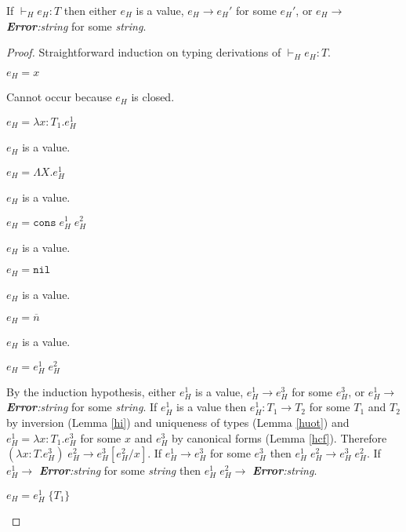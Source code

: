 \begin{hps}
\label{hps}
If $\vdash_{H}e_{H}:T$ then either $e_{H}$ is a value, $e_{H}\rightarrow e_{H}'$ for some $e_{H}'$, or $e_{H}\rightarrow$ \emph{\textbf{Error}:\;string} for some \emph{string}.



\begin{proof}
Straightforward induction on typing derivations of $\vdash_{H}e_{H}:T$.
\begin{hps-case-1}
$e_{H}=x$

Cannot occur because $e_{H}$ is closed.
\end{hps-case-1}
\begin{hps-case-2}
$e_{H}=\lambda x:T_{1}.e_{H}^{1}$

$e_{H}$ is a value.
\end{hps-case-2}
\begin{hps-case-3}
$e_{H}=\Lambda X.e_{H}^{1}$

$e_{H}$ is a value.
\end{hps-case-3}
\begin{hps-case-4}
$e_{H}=\mathtt{cons}\;e_{H}^{1}\;e_{H}^{2}$

$e_{H}$ is a value.
\end{hps-case-4}
\begin{hps-case-5}
$e_{H}=\mathtt{nil}$

$e_{H}$ is a value.
\end{hps-case-5}
\begin{hps-case-6}
$e_{H}=\overline{n}$

$e_{H}$ is a value.
\end{hps-case-6}
\begin{hps-case-7}
$e_{H}=e_{H}^{1}\;e_{H}^{2}$

By the induction hypothesis, either $e_{H}^{1}$ is a value, $e_{H}^{1}\rightarrow e_{H}^{3}$ for some $e_{H}^{3}$, or $e_{H}^{1}\rightarrow$ \emph{\textbf{Error}:\;string} for some \emph{string}.  If $e_{H}^{1}$ is a value then $e_{H}^{1}:T_{1}\rightarrow T_{2}$ for some $T_{1}$ and $T_{2}$ by inversion (Lemma \ref{hi}) and uniqueness of types (Lemma \ref{huot}) and $e_{H}^{1}=\lambda x:T_{1}.e_{H}^{3}$ for some $x$ and $e_{H}^{3}$ by canonical forms (Lemma \ref{hcf}).  Therefore $(\lambda x:T.e_{H}^{3})\;e_{H}^{2}\rightarrow e_{H}^{3}[e_{H}^{2}/x]$.  If $e_{H}^{1}\rightarrow e_{H}^{3}$ for some $e_{H}^{3}$ then $e_{H}^{1}\;e_{H}^{2}\rightarrow e_{H}^{3}\;e_{H}^{2}$.  If $e_{H}^{1}\rightarrow$ \emph{\textbf{Error}:\;string} for some \emph{string} then $e_{H}^{1}\;e_{H}^{2}\rightarrow$ \emph{\textbf{Error}:\;string}.
\end{hps-case-7}
\begin{hps-case-8}
$e_{H}=e_{H}^{1}\;\lbrace T_{1}\rbrace$


\end{hps-case-8}
\end{proof}
\end{hps}
